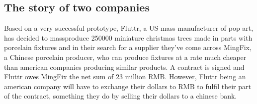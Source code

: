 \documentclass[11pt]{article}
\begin{document}



 



\subsection{The story of two companies}


Based on a very successful prototype, Fluttr, a US mass manufacturer of pop art,  has decided to massproduce 
250000 miniature christmas trees made in parts with porcelain fixtures 
and in their search for a supplier they've come across MingFix, a Chinese porcelain producer,  who can 
produce fixtures at a rate much cheaper than american companies 
producing similar products. A contract is signed and Fluttr owes 
MingFix the net sum of 23 million RMB. However, Fluttr being an american 
company will have to exchange their dollars to RMB to fulfil their part 
of the contract, something they do by selling their dollars to a chinese 
bank.

\end{document}
